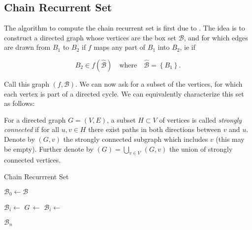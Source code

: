 
\subsection{Chain Recurrent Set}

The algorithm to compute the chain recurrent set is first due to \cite*{chain}. The idea 
is to construct a directed graph whose vertices are the box set $\mathcal{B}$, and for 
which edges are drawn from $B_1$ to $B_2$ if $f$ maps any part of $B_1$ into $B_2$, ie if 

\begin{equation}
    B_2 \in f(\hat{\mathcal{B}}) \quad \text{where} \quad \hat{\mathcal{B}} = \left\{ B_1 \right\}. 
\end{equation}

Call this graph $(f, \mathcal{B})$. We can now ask for a subset of the 
vertices, for which each vertex is part of a directed cycle. We can equivalently 
characterize this set as follows:

\begin{definition}
    \cite*{dynbook} For a directed graph $G = (V, E)$, a subset $H \subset V$ of vertices 
    is called \emph{strongly connected} if for all $u, v \in H$ there 
    exist paths in both directions between $v$ and $u$. Denote by $(G, v)$ 
    the strongly connected subgraph which includes $v$ (this may be empty).  
    Further denote by $(G) = \bigcup_{v \in V}\,$$(G, v)$ 
    the union of strongly connected vertices.
\end{definition}

\begin{algorithm}
    \caption{Chain Recurrrent Set}
    \label{alg:chain}

    \begin{algorithmic}[1]
        \State $\mathcal{B}_0 \gets \mathcal{B}$

            \State $\mathcal{B}_i \gets$ 
            \State $G\, \gets$ 
            \State $\mathcal{B}_i \gets$ 
        \EndFor

        \State \Return $\mathcal{B}_n$
    \end{algorithmic}
\end{algorithm}


